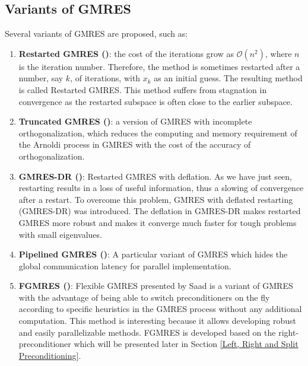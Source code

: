 \subsection{Variants of GMRES}

Several variants of GMRES are proposed, such as:

\begin{enumerate}
	\item \textbf{Restarted GMRES (\cite{morgan1995restarted})}: the cost of the iterations grow as $\mathcal{O}(n^2)$, where $n$ is the iteration number. Therefore, the method is sometimes restarted after a number, say $k$, of iterations, with $x_k$ as an initial guess. The resulting method is called Restarted GMRES. This method suffers from stagnation in convergence as the restarted subspace is often close to the earlier subspace.
	
	\item \textbf{Truncated GMRES (\cite{de1999truncation})}: a version of GMRES with incomplete orthogonalization, which reduces the computing and memory requirement of the Arnoldi process in GMRES with the cost of the accuracy of orthogonalization.
	
	\item \textbf{GMRES-DR (\cite{erhel1996restarted})}: Restarted GMRES with deflation. As we have just seen, restarting results in a loss of useful information, thus a slowing of convergence after a restart. To overcome this problem, GMRES with deflated restarting (GMRES-DR) was introduced. The deflation in GMRES-DR makes restarted GMRES more robust and makes it converge much faster for tough problems with small eigenvalues.
	
	\item \textbf{Pipelined GMRES (\cite{ghysels2014hiding})}: A particular variant of GMRES which hides the global communication latency for parallel implementation.
	
	\item \textbf{FGMRES (\cite{fraysse2008algorithm})}: Flexible GMRES presented by Saad is a variant of GMRES with the advantage of being able to switch preconditioners on the fly according to specific heuristics in the GMRES process without any additional computation. This method is interesting because it allows developing robust and easily parallelizable methods. FGMRES is developed based on the right-preconditioner which will be presented later in Section \ref{Left, Right and Split Preconditioning}.
	
\end{enumerate}



